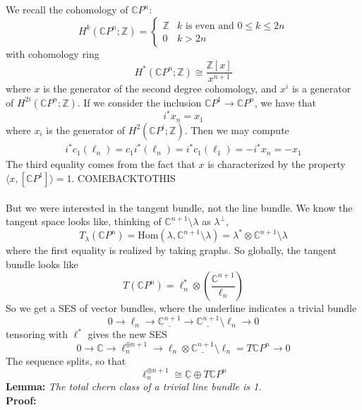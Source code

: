 \documentclass[12pt]{report}
\theoremstyle{definition}
\theoremstyle{remark}
\numberwithin{equation}{section}
\theoremstyle{definition}
\newcommand{\bb}[1]{\mathbb{#1}}
\begin{document}
We recall the cohomology of $\bb CP^n$: 
$$
H^k(\bb CP^n; \bb Z) = \begin{cases}
	\bb Z & k\text{ is even and } 0 \leq k \leq 2n\\
	0 & k >  2n
\end{cases}
$$
with cohomology ring 
$$
H^*(\bb CP^n; \bb Z) \cong \frac{\bb Z[x]}{x^{n+1}}
$$
where $x$ is the generator of the second degree cohomology, and $x^i$ is a generator of $H^{2i}(\bb CP^n; \bb Z)$. If we consider the inclusion $\bb CP^1 \to \bb CP^n$, we have that 
$$
	i^* x_n = x_1
$$
where $x_i$ is the generator of $H^2(\bb CP^i; \bb Z)$. Then we may compute 
\begin{gather*}
	i^*c_1(\ell_n) = c_1i^*(\ell_n) = i^*c_1(\ell_1) = -i^*x_n = -x_1
\end{gather*}
The third equality comes from the fact that $x$ is characterized by the property $\langle x, [\bb CP^1] \rangle = 1$. COMEBACKTOTHIS\\\\
But we were interested in the tangent bundle, not the line bundle. We know the tangent space looks like, thinking of $\bb C^{n+1}\setminus \lambda$ as $\lambda^\perp$,
$$
	T_\lambda(\bb CP^n) = \text{Hom}(\lambda, \bb C^{n+1}\setminus \lambda) = \lambda^* \otimes \bb C^{n+1}\setminus \lambda
$$
where the first equality is realized by taking graphs. So globally, the tangent bundle looks like 
$$
	T(\bb CP^n) = \ell_n^* \otimes \left(\frac{\bb C^{n+1}}{\ell_n}\right)
$$
So we get a SES of vector bundles, where the underline indicates a trivial bundle
$$
	0 \to \ell_n \to \underline{\bb C^{n+1}} \to \underline{\bb C^{n+1}}\setminus \ell_n \to 0
$$
tensoring with $\ell^*$ gives the new SES
$$
	0 \to \bb C \to \ell_n^{\oplus n+1} \to \ell_n \otimes \underline{\bb C^{n+1}}\setminus \ell_n = T\bb CP^n\to 0
$$
The sequence splits, so that 
$$
\ell_n^{\oplus n + 1} \cong \underline{\bb C} \oplus T\bb CP^n
$$
\textbf{Lemma: }\textit{The total chern class of a trivial line bundle is 1.}\\
\textbf{Proof: }
\end{document}
